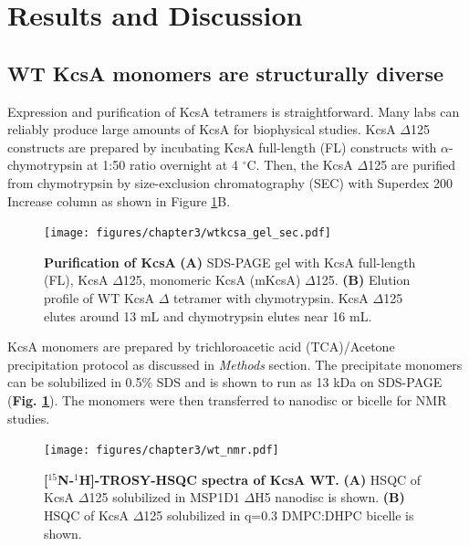 \section{Results and Discussion}
\subsection{WT KcsA monomers are structurally diverse}

Expression and purification of KcsA tetramers is straightforward. Many labs can reliably produce large amounts of KcsA for biophysical studies. \citep{chill2007, valiyaveetil2002semi, barrera2005, tilegenova2016, bhate2013, takeuchi2007, cortes1997} KcsA $\Delta$125 constructs are prepared by incubating KcsA full-length (FL) constructs with $\alpha$-chymotrypsin at 1:50 ratio overnight at 4 $^{\circ}$C. Then, the KcsA $\Delta$125 are purified from chymotrypsin by size-exclusion chromatography (SEC) with Superdex 200 Increase column as shown in Figure \ref{fig:ch3_f2}B.

\begin{figure}[!ht]
\begin{center}
	\texttt{[image: figures/chapter3/wtkcsa\_gel\_sec.pdf]}
\end{center}
	\caption{\textbf{Purification of KcsA} \textbf{(A)} SDS-PAGE gel with KcsA full-length (FL), KcsA $\Delta$125, monomeric KcsA (mKcsA) $\Delta$125. \textbf{(B)} Elution profile of WT KcsA $\Delta$ tetramer with chymotrypsin. KcsA $\Delta$125 elutes around 13 mL and chymotrypsin elutes near 16 mL.}
	\label{fig:ch3_f2}
\end{figure}

KcsA monomers are prepared by trichloroacetic acid (TCA)/Acetone precipitation protocol as discussed in \textit{Methods} section. The precipitate monomers can be solubilized in 0.5\% SDS and is shown to run as 13 kDa on SDS-PAGE (\textbf{Fig. \ref{fig:ch3_f2}}). The monomers were then transferred to nanodisc or bicelle for NMR studies.

\begin{figure}[!ht]
\begin{center}
	\texttt{[image: figures/chapter3/wt\_nmr.pdf]}
\end{center}
	\caption{\textbf{[$^{15}$N-$^{1}$H]-TROSY-HSQC spectra of KcsA WT.}  \textbf{(A)} HSQC of KcsA $\Delta$125 solubilized in MSP1D1 $\Delta$H5 nanodisc is shown. \textbf{(B)} HSQC of KcsA $\Delta$125 solubilized in q=0.3 DMPC:DHPC bicelle is shown.}
	\label{fig:ch3_f3}
\end{figure}

